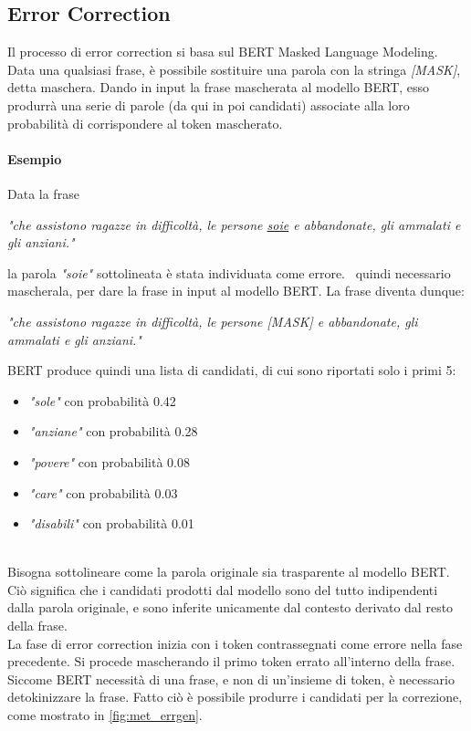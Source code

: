 \subsection{Error Correction}
\label{sec:met_errcor}

Il processo di error correction si basa sul BERT Masked Language Modeling. Data una qualsiasi frase, è possibile sostituire una parola con la stringa \textit{[MASK]}, detta maschera. Dando in input la frase mascherata al modello BERT, esso produrrà una serie di parole (da qui in poi candidati) associate alla loro probabilità di corrispondere al token mascherato.

\paragraph{Esempio} Data la frase 
\begin{center}
\textit{"che assistono ragazze in difficoltà, le persone \underline{soie} e abbandonate, gli ammalati e gli anziani."}
\end{center}
la parola \textit{"soie"} sottolineata è stata individuata come errore. \E\ quindi necessario mascherala, per dare la frase in input al modello BERT. La frase diventa dunque:
\begin{center}
\textit{"che assistono ragazze in difficoltà, le persone [MASK] e abbandonate, gli ammalati e gli anziani."}
\end{center}
BERT produce quindi una lista di candidati, di cui sono riportati solo i primi 5:
\begin{itemize}
\item \textit{"sole"} con probabilità 0.42
\item \textit{"anziane"} con probabilità 0.28
\item \textit{"povere"} con probabilità 0.08
\item \textit{"care"} con probabilità 0.03
\item \textit{"disabili"} con probabilità 0.01
\end{itemize}
\ \\
Bisogna sottolineare come la parola originale sia trasparente al modello BERT. Ciò significa che i candidati prodotti dal modello sono del tutto indipendenti dalla parola originale, e sono inferite unicamente dal contesto derivato dal resto della frase.\\
La fase di error correction inizia con i token contrassegnati come errore nella fase precedente. Si procede mascherando il primo token errato all'interno della frase. Siccome BERT necessità di una frase, e non di un'insieme di token, è necessario detokinizzare la frase. Fatto ciò è possibile produrre i candidati per la correzione, come mostrato in \autoref{fig:met_errgen}.


